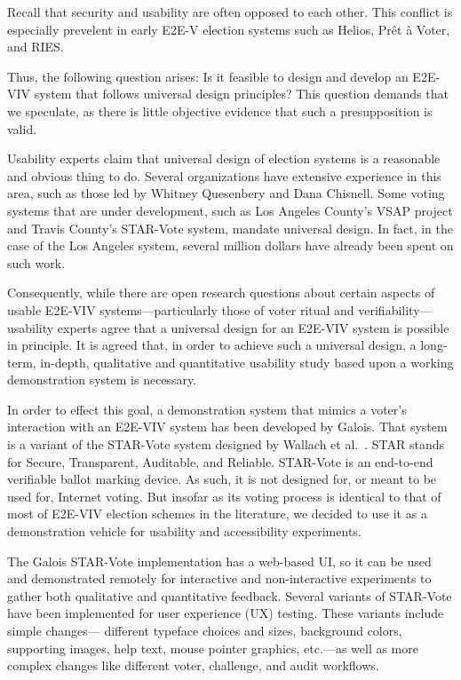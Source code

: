 Recall that security and usability are often opposed to each other.
This conflict is especially prevelent in early E2E-V election systems
such as Helios, Prêt à Voter, and RIES.

Thus, the following question arises: Is it feasible to design and
develop an E2E-VIV system that follows universal design principles?
This question demands that we speculate, as there is little objective
evidence that such a presupposition is valid.

Usability experts claim that universal design of election systems is a
reasonable and obvious thing to do. Several organizations have
extensive experience in this area, such as those led by Whitney
Quesenbery and Dana Chisnell. Some voting systems that are under
development, such as Los Angeles County's VSAP project and Travis
County's STAR-Vote system, mandate universal design. In fact, in the
case of the Los Angeles system, several million dollars have already
been spent on such work.

Consequently, while there are open research questions about certain
aspects of usable E2E-VIV systems---particularly those of voter ritual
and verifiability---usability experts agree that a universal design
for an E2E-VIV system is possible in principle. It is agreed that, in
order to achieve such a universal design, a long-term, in-depth,
qualitative and quantitative usability study based upon a working
demonstration system is necessary.


In order to effect this goal, a demonstration system that mimics a
voter's interaction with an E2E-VIV system has been developed by
Galois. That system is a variant of the STAR-Vote system designed by
Wallach et al.~\cite{star-vote}. STAR stands for Secure, Transparent,
Auditable, and Reliable. STAR-Vote is an end-to-end verifiable ballot
marking device. As such, it is not designed for, or meant to be used
for, Internet voting. But insofar as its voting process is identical
to that of most of E2E-VIV election schemes in the literature, we
decided to use it as a demonstration vehicle for usability and
accessibility experiments.

The Galois STAR-Vote implementation has a web-based UI, so it can be
used and demonstrated remotely for interactive and non-interactive
experiments to gather both qualitative and quantitative feedback.
Several variants of STAR-Vote have been implemented for user
experience (UX) testing.  These variants include simple changes---
different typeface choices and sizes, background colors, supporting
images, help text, mouse pointer graphics, etc.---as well as more
complex changes like different voter, challenge, and audit workflows.

